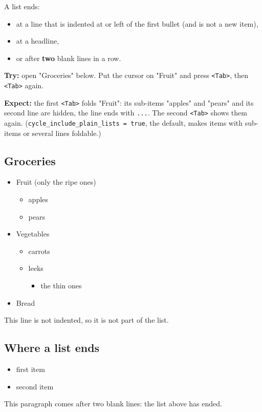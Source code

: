 A list ends:
\begin{itemize}
\item at a line that is indented at or left of the first bullet (and is not a
new item),
\item at a headline,
\item or after \textbf{two} blank lines in a row.
\end{itemize}

\textbf{Try:} open "Groceries" below. Put the cursor on "Fruit" and press \texttt{<Tab>},
then \texttt{<Tab>} again.

\textbf{Expect:} the first \texttt{<Tab>} folds "Fruit": its sub-items "apples" and
"pears" and its second line are hidden, the line ends with \texttt{...}. The
second \texttt{<Tab>} shows them again. (\texttt{cycle\_include\_plain\_lists = true}, the
default, makes items with sub-items or several lines foldable.)
\subsection{Groceries}
\label{sec:orgaf6c356}
\begin{itemize}
\item Fruit
(only the ripe ones)
\begin{itemize}
\item apples
\item pears
\end{itemize}
\item Vegetables
\begin{itemize}
\item carrots
\item leeks
\begin{itemize}
\item the thin ones
\end{itemize}
\end{itemize}
\item Bread
\end{itemize}
This line is not indented, so it is not part of the list.
\subsection{Where a list ends}
\label{sec:orge1f6803}
\begin{itemize}
\item first item
\item second item
\end{itemize}


This paragraph comes after two blank lines: the list above has ended.

